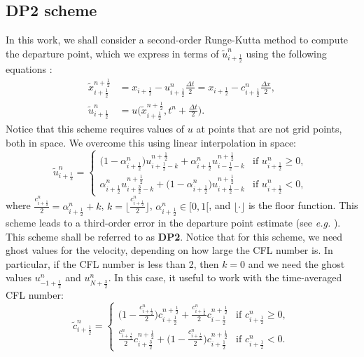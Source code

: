 \subsection{DP2 scheme}
\label{chp-adv1d-sec-DP2}
In this work, we shall
consider a second-order Runge-Kutta method to compute the departure point, which we express in terms of
$\tilde{u}^n_{i+\frac{1}{2}}$ using the following equations \citep{durran:2010}:
\begin{align}
	\label{chp-sec-flux:dp_DP2}
	\tilde{x}_{i+\frac{1}{2}}^{n+\frac{1}{2}} &= x_{i+\frac{1}{2}} - u_{i+\frac{1}{2}}^n
	 \frac{\Delta t}{2} = x_{i+\frac{1}{2}} - c_{i+\frac{1}{2}}^n \frac{\Delta x}{2}, \nonumber \\
	\tilde{u}^n_{i+\frac{1}{2}} &= u\bigg(\tilde{x}^{n+\frac{1}{2}}_{i+\frac{1}{2}}, t^n + \frac{\Delta t}{2}\bigg).
\end{align}
Notice that this scheme requires values of $u$ at points that are not grid points,
both in space. We overcome this using linear interpolation in space:
\begin{equation}
	\tilde{u}^n_{i+\frac{1}{2}} =
	\begin{cases}
		\big(1-\alpha_{i+\frac{1}{2}}^n \big)u^{n+\frac{1}{2}}_{i+\frac{1}{2}-k} +
        \alpha_{i+\frac{1}{2}}^n u^{n+\frac{1}{2}}_{i-\frac{1}{2}-k} & \text{if } {u}^n_{i+\frac{1}{2}}\geq 0,\\
		\alpha_{i+\frac{1}{2}}^n u^{n+\frac{1}{2}}_{i+\frac{3}{2}-k} + \big(1-\alpha_{i+\frac{1}{2}}^n\big)
        u^{n+\frac{1}{2}}_{i+\frac{1}{2}-k} & \text{if } {u}^n_{i+\frac{1}{2}} < 0,\
	\end{cases}
\end{equation}
where $\frac{c_{i+\frac{1}{2}}^n}{2} = \alpha_{i+\frac{1}{2}}^n + k$, 
$k=\lfloor \frac{c_{i+\frac{1}{2}}^n}{2} \rfloor$, $\alpha_{i+\frac{1}{2}}^n \in [0,1[$, and $\lfloor \cdot \rfloor$ is
the floor function. This scheme leads to a third-order error in the departure point estimate (see \textit{e.g.} 
\citet[Section 7.1.2]{durran:2010}). This scheme shall be referred to as \textbf{DP2}. 
Notice that for this scheme, we need ghost values for the velocity, depending on how large the CFL number is.
In particular, if the CFL number is less than 2, then $k=0$ and we need the ghost values $u_{-1+\frac{1}{2}}^n$ and $u_{N+\frac{3}{2}}^n$.
In this case, it useful to work with the time-averaged CFL number:
\begin{equation}
	\tilde{c}^n_{i+\frac{1}{2}} =
	\begin{cases}
		\bigg(1-\frac{c_{i+\frac{1}{2}}^n}{2} \bigg)c^{n+\frac{1}{2}}_{i+\frac{1}{2}} +
     \frac{c_{i+\frac{1}{2}}^n}{2} c^{n+\frac{1}{2}}_{i-\frac{1}{2}} & \text{if } {c}^n_{i+\frac{1}{2}}\geq 0,\\
		\frac{c_{i+\frac{1}{2}}^n}{2} c^{n+\frac{1}{2}}_{i+\frac{3}{2}} + \bigg(1-\frac{c_{i+\frac{1}{2}}^n}{2}\bigg)
        c^{n+\frac{1}{2}}_{i+\frac{1}{2}} & \text{if } {c}^n_{i+\frac{1}{2}} < 0.\
	\end{cases}
\end{equation}

